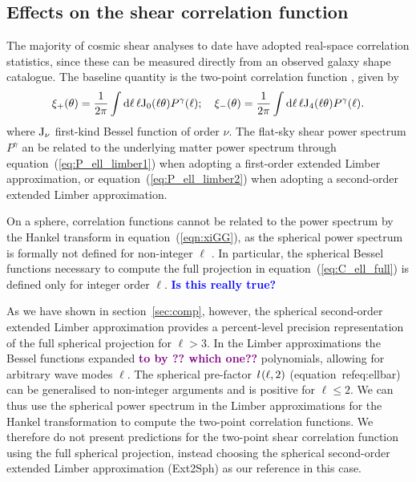 \documentclass[fleqn,usenatbib]{mnras} %
\newcommand{\ellbar}{\hbox{\it \l}\,}
\newcommand{\mk}[1]{{\bf\textcolor{blue}{#1}}}
\newcommand{\ch}[1]{\textcolor{purple}{\bf #1}}
\begin{document}
\subsection{Effects on the shear correlation function}
\label{sec:comp_xi}

The majority of cosmic shear analyses to date have adopted real-space
correlation statistics, since these can be measured directly from an observed
galaxy shape catalogue. The baseline quantity is the two-point correlation
function \citep{1991ApJ...370....1M, 1992ApJ...388..272K,
BS01}, given by
%
\begin{align}
  \xi_+(\theta) 
  = \frac 1 {2\pi} \int {\rm d} \ell \, \ell {\rm J}_0(\ell
   \theta)
  P^\gamma(\ell);
  \quad
   \xi_-(\theta)
  = \frac 1 {2\pi} \int
   {\rm d} \ell \, \ell {\rm J}_4(\ell \theta)
  P^\gamma(\ell).
   \label{eqn:xiGG}
\end{align}
%
where ${\rm J}_\nu$ first-kind Bessel function of order $\nu$. The flat-sky
shear power spectrum $P^\gamma$ an be related to the underlying matter power
spectrum through equation~(\ref{eq:P_ell_limber1}) when adopting a first-order
extended Limber approximation, or equation~(\ref{eq:P_ell_limber2}) when adopting
a second-order extended Limber approximation.

On a sphere, correlation functions cannot be related to the power spectrum by the
Hankel transform in equation~(\ref{eqn:xiGG}), as the spherical power spectrum is
formally not defined for non-integer $\ell$ \citep[see][for alternative
spherical-sky formulae for the two-point correlation
function]{2005PhRvD..72b3516C}. In particular, the spherical Bessel functions
necessary to compute the full projection in equation~(\ref{eq:C_ell_full}) is defined only
for integer order $\ell$. \mk{Is this really true?}

As we have shown in section~\ref{sec:comp}, however, the spherical
second-order extended Limber approximation provides a percent-level precision
representation of the full spherical projection for $\ell > 3$.  
In the Limber approximations the Bessel functions expanded \ch{to by ?? which one??}
polynomials, allowing for arbitrary wave modes $\ell$. The spherical pre-factor
$\ellbar(\ell, 2)$ (equation~ref{eq:ellbar}) can be generalised to non-integer
arguments and is positive for $\ell \le 2$. We can thus use the spherical power
spectrum in the Limber approximations for the Hankel transformation to compute
the two-point correlation functions.  We therefore do not
present predictions for the two-point shear correlation function using the full
spherical projection, instead choosing the spherical second-order extended
Limber approximation (Ext2Sph) as our reference in this case.
\end{document}
